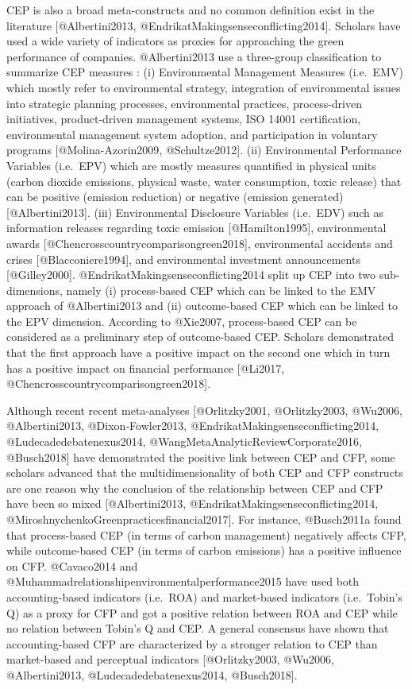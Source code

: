 \documentclass[]{article}
\begin{document}
CEP is also a broad meta-constructs and no common definition exist in
the literature {[}@Albertini2013,
@EndrikatMakingsenseconflicting2014{]}. Scholars have used a wide
variety of indicators as proxies for approaching the green performance
of companies. @Albertini2013 use a three-group classification to
summarize CEP measures : (i) Environmental Management Measures
(i.e.~EMV) which mostly refer to environmental strategy, integration of
environmental issues into strategic planning processes, environmental
practices, process-driven initiatives, product-driven management
systems, ISO 14001 certification, environmental management system
adoption, and participation in voluntary programs {[}@Molina-Azorin2009,
@Schultze2012{]}. (ii) Environmental Performance Variables (i.e.~EPV)
which are mostly measures quantified in physical units (carbon dioxide
emissions, physical waste, water consumption, toxic release) that can be
positive (emission reduction) or negative (emission generated)
{[}@Albertini2013{]}. (iii) Environmental Disclosure Variables
(i.e.~EDV) such as information releases regarding toxic emission
{[}@Hamilton1995{]}, environmental awards
{[}@Chencrosscountrycomparisongreen2018{]}, environmental accidents and
crises {[}@Blacconiere1994{]}, and environmental investment
announcements {[}@Gilley2000{]}. @EndrikatMakingsenseconflicting2014
split up CEP into two sub-dimensions, namely (i) process-based CEP which
can be linked to the EMV approach of @Albertini2013 and (ii)
outcome-based CEP which can be linked to the EPV dimension. According to
@Xie2007, process-based CEP can be considered as a preliminary step of
outcome-based CEP. Scholars demonstrated that the first approach have a
positive impact on the second one which in turn has a positive impact on
financial performance {[}@Li2017,
@Chencrosscountrycomparisongreen2018{]}.

Although recent recent meta-analyses {[}@Orlitzky2001, @Orlitzky2003,
@Wu2006, @Albertini2013, @Dixon-Fowler2013,
@EndrikatMakingsenseconflicting2014, @Ludecadedebatenexus2014,
@WangMetaAnalyticReviewCorporate2016, @Busch2018{]} have demonstrated
the positive link between CEP and CFP, some scholars advanced that the
multidimensionality of both CEP and CFP constructs are one reason why
the conclusion of the relationship between CEP and CFP have been so
mixed {[}@Albertini2013, @EndrikatMakingsenseconflicting2014,
@MiroshnychenkoGreenpracticesfinancial2017{]}. For instance, @Busch2011a
found that process-based CEP (in terms of carbon management) negatively
affects CFP, while outcome-based CEP (in terms of carbon emissions) has
a positive influence on CFP. @Cavaco2014 and
@Muhammadrelationshipenvironmentalperformance2015 have used both
accounting-based indicators (i.e.~ROA) and market-based indicators
(i.e.~Tobin's Q) as a proxy for CFP and got a positive relation between
ROA and CEP while no relation between Tobin's Q and CEP. A general
consensus have shown that accounting-based CFP are characterized by a
stronger relation to CEP than market-based and perceptual indicators
{[}@Orlitzky2003, @Wu2006, @Albertini2013, @Ludecadedebatenexus2014,
@Busch2018{]}.
\end{document}
